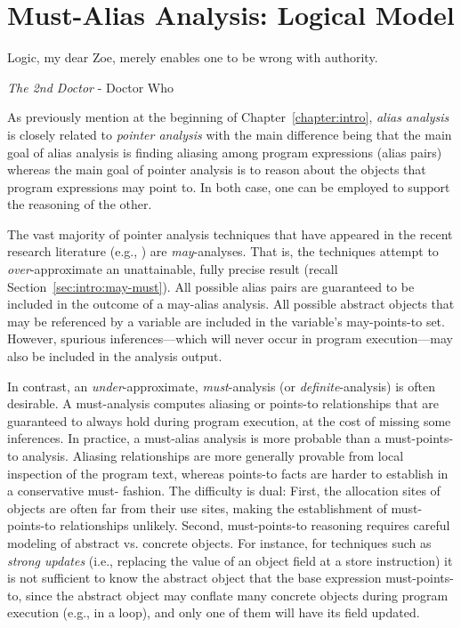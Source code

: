\chapter{Must-Alias Analysis: Logical Model}
\label{chapter:must-logic}
\epigraph{Logic, my dear Zoe, merely enables one to be wrong with authority.}{\textit{The 2nd Doctor} - Doctor Who}

As previously mention at the beginning of Chapter~\ref{chapter:intro}, \emph{alias analysis} is closely related to \emph{pointer analysis} with the main difference being that the main goal of alias analysis is finding aliasing among program expressions (alias pairs) whereas the main goal of pointer analysis is to reason about the objects that program expressions may point to. In both case, one can be employed to support the reasoning of the other.

The vast majority of pointer analysis techniques that have appeared in the recent research literature (e.g., \cite{pldi:1999:Yong,pldi:2003:Berndl,cc:2013:Kastrinis,pldi:2007:Hardekopf,article:2005:Milanova,pldi:2004:Whaley,pldi:2006:Sridharan}) are \emph{may}-analyses. That is, the techniques attempt to \emph{over}-approximate an unattainable, fully precise result (recall Section~\ref{sec:intro:may-must}). All possible alias pairs are guaranteed to be included in the outcome of a may-alias analysis. All possible abstract objects that may be referenced by a variable are included in the variable's may-points-to set. However, spurious inferences---which will never occur in program execution---may also be included in the analysis output.

In contrast, an \emph{under}-approximate, \emph{must}-analysis (or \emph{definite}-analysis) is often desirable. A must-analysis computes aliasing or points-to relationships that are guaranteed to always hold during program execution, at the cost of missing some inferences. In practice, a must-alias analysis is more probable than a must-points-to analysis. Aliasing relationships are more generally provable from local inspection of the program text, whereas points-to facts are harder to establish in a conservative must- fashion. The difficulty is dual: First, the allocation sites of objects are often far from their use sites, making the establishment of must-points-to relationships unlikely. Second, must-points-to reasoning requires careful modeling of abstract vs. concrete objects. For instance, for techniques such as \emph{strong updates} (i.e., replacing the value of an object field at a store instruction) it is not sufficient to know the abstract object that the base expression must-points-to, since the abstract object may conflate many concrete objects during program execution (e.g., in a loop), and only one of them will have its field updated.

